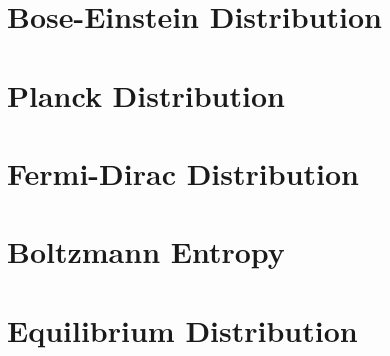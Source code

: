 \documentclass[10pt]{report}
\begin{document}
\section{Bose-Einstein Distribution}
\clearpage

\section{Planck Distribution}
\clearpage

\section{Fermi-Dirac Distribution}
\clearpage

\section{Boltzmann Entropy}
\clearpage

\section{Equilibrium Distribution}
\clearpage




\nocite{*}
\printbibliography
{}
\end{document}
